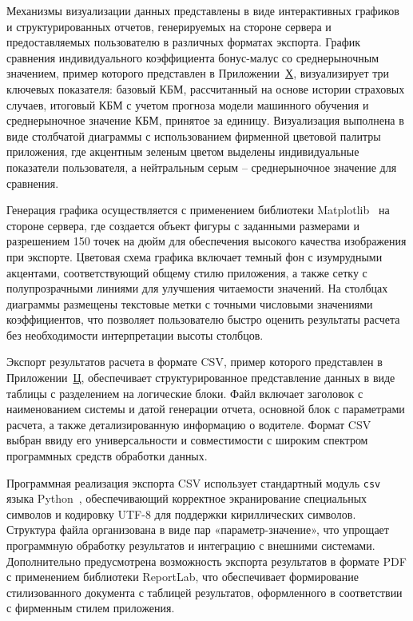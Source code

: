 Механизмы визуализации данных представлены в виде интерактивных графиков и структурированных отчетов, генерируемых на стороне сервера и предоставляемых пользователю в различных форматах экспорта. График сравнения индивидуального коэффициента бонус-малус со среднерыночным значением, пример которого представлен в Приложении~\hyperref[app:kbm_graph]{Х}, визуализирует три ключевых показателя: базовый КБМ, рассчитанный на основе истории страховых случаев, итоговый КБМ с учетом прогноза модели машинного обучения и среднерыночное значение КБМ, принятое за единицу. Визуализация выполнена в виде столбчатой диаграммы с использованием фирменной цветовой палитры приложения, где акцентным зеленым цветом выделены индивидуальные показатели пользователя, а нейтральным серым – среднерыночное значение для сравнения.

Генерация графика осуществляется с применением библиотеки Matplotlib~\cite{matplotlib2026docs} на стороне сервера, где создается объект фигуры с заданными размерами и разрешением 150 точек на дюйм для обеспечения высокого качества изображения при экспорте. Цветовая схема графика включает темный фон с изумрудными акцентами, соответствующий общему стилю приложения, а также сетку с полупрозрачными линиями для улучшения читаемости значений. На столбцах диаграммы размещены текстовые метки с точными числовыми значениями коэффициентов, что позволяет пользователю быстро оценить результаты расчета без необходимости интерпретации высоты столбцов.

Экспорт результатов расчета в формате CSV, пример которого представлен в Приложении~\hyperref[app:csv_example]{Ц}, обеспечивает структурированное представление данных в виде таблицы с разделением на логические блоки. Файл включает заголовок с наименованием системы и датой генерации отчета, основной блок с параметрами расчета, а также детализированную информацию о водителе. Формат CSV выбран ввиду его универсальности и совместимости с широким спектром программных средств обработки данных.

Программная реализация экспорта CSV использует стандартный модуль \texttt{csv} языка Python~\cite{python2026docs}, обеспечивающий корректное экранирование специальных символов и кодировку UTF-8 для поддержки кириллических символов. Структура файла организована в виде пар «параметр-значение», что упрощает программную обработку результатов и интеграцию с внешними системами. Дополнительно предусмотрена возможность экспорта результатов в формате PDF с применением библиотеки ReportLab, что обеспечивает формирование стилизованного документа с таблицей результатов, оформленного в соответствии с фирменным стилем приложения.

